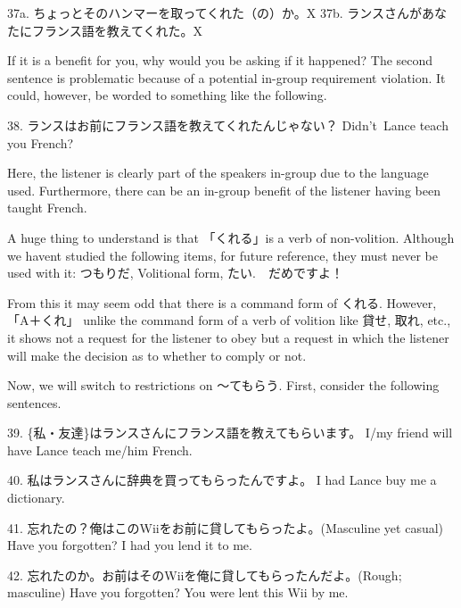 \par{37a. ちょっとそのハンマーを取ってくれた（の）か。X \hfill\break
37b. ランスさんがあなたにフランス語を教えてくれた。X }

\par{ If it is a benefit for you, why would you be asking if it happened? The second sentence is problematic because of a potential in-group requirement violation. It could, however, be worded to something like the following. }
 
\par{38. ランスはお前にフランス語を教えてくれたんじゃない？ \hfill\break
Didn't Lance teach you French? }

\par{ Here, the listener is clearly part of the speaker\textquotesingle s in-group due to the language used. Furthermore, there can be an in-group benefit of the listener having been taught French. }
 
\par{ A huge thing to understand is that 「くれる」is a verb of non-volition. Although we haven\textquotesingle t studied the following items, for future reference, they must never be used with it: つもりだ, Volitional form, たい.　だめですよ！ }
 
\par{ From this it may seem odd that there is a command form of くれる. However, 「A＋くれ」 unlike the command form of a verb of volition like 貸せ, 取れ, etc., it shows not a request for the listener to obey but a request in which the listener will make the decision as to whether to comply or not. }
 
\par{ Now, we will switch to restrictions on ～てもらう. First, consider the following sentences. }
 
\par{39. \{私・友達\}はランスさんにフランス語を教えてもらいます。 \hfill\break
I\slash my friend will have Lance teach me\slash him French. }
 
\par{40. 私はランスさんに辞典を買ってもらったんですよ。 \hfill\break
I had Lance buy me a dictionary. }
 
\par{41. 忘れたの？俺はこのWiiをお前に貸してもらったよ。(Masculine yet casual) \hfill\break
Have you forgotten? I had you lend it to me. }
 
\par{42. 忘れたのか。お前はそのWiiを俺に貸してもらったんだよ。(Rough; masculine) \hfill\break
Have you forgotten? You were lent this Wii by me. }
 
